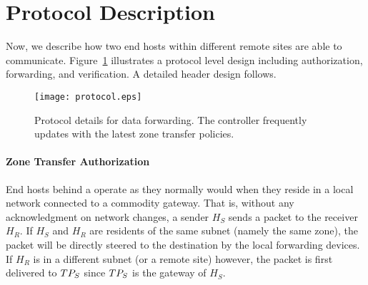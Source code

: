 


\section{Protocol Description}
\label{sec:protocol}

Now, we describe how two end hosts within different remote sites are able to communicate. 
Figure~\ref{fig:protocol} illustrates a protocol level design including authorization,
forwarding, and verification. A detailed header design follows.

\begin{figure}[t]
\begin{center}
\texttt{[image: protocol.eps]}
\end{center}
\caption{Protocol details for data forwarding. The controller frequently updates \tps 
with the latest zone transfer policies.}
\label{fig:protocol}
\end{figure}


\paragraph{Zone Transfer Authorization}
End hosts behind a \tp operate as they normally would when they reside in a local network connected to a commodity gateway. That is, without any acknowledgment on network changes, a sender $H_S$ 
sends a packet to the receiver $H_R$. If $H_S$ and $H_R$ are residents of the same subnet 
(namely the same zone), the packet will be directly steered to the destination by the local 
forwarding devices. If $H_R$ is in a different subnet (or a remote site) however, the packet
is first delivered to $TP_S$ since $TP_S$ is the gateway of $H_S$. %

